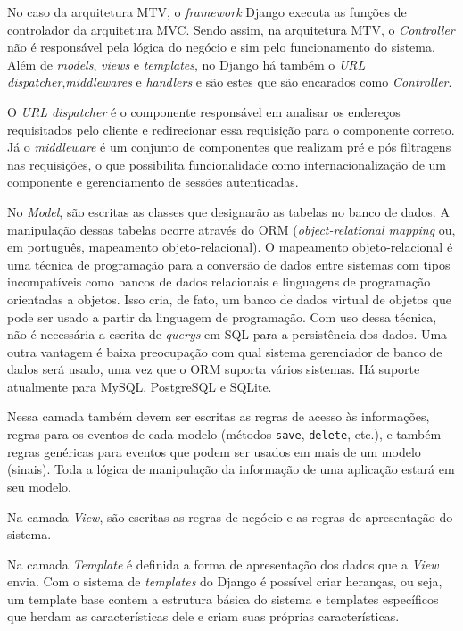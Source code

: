     No caso da arquitetura MTV, o \textit{framework} Django executa as funções de controlador da arquitetura MVC. Sendo assim, na arquitetura MTV, o \textit{Controller} não é responsável pela lógica do negócio e sim pelo funcionamento do sistema. Além de \textit{models}, \textit{views} e \textit{templates}, no Django há também o \textit{URL dispatcher},\textit{middlewares} e \textit{handlers} e são estes que são encarados como \textit{Controller}.

    O \textit{URL dispatcher} é o componente responsável em analisar os endereços requisitados pelo cliente e redirecionar essa requisição para o componente correto. Já o \textit{middleware} é um conjunto de componentes que realizam pré e pós filtragens nas requisições, o que possibilita funcionalidade como internacionalização de um componente e gerenciamento de sessões autenticadas.

    No \textit{Model}, são escritas as classes que designarão as tabelas no banco de dados. A manipulação dessas tabelas ocorre através do ORM (\textit{object-relational mapping} ou, em português, mapeamento objeto-relacional). O mapeamento objeto-relacional é uma técnica de programação para a conversão de dados entre sistemas com tipos incompatíveis como bancos de dados relacionais e linguagens de programação orientadas a objetos. Isso cria, de fato, um banco de dados virtual de objetos que pode ser usado a partir da linguagem de programação. Com uso dessa técnica, não é necessária a escrita de \textit{querys} em SQL para a persistência dos dados. Uma outra vantagem é baixa preocupação com qual sistema gerenciador de banco de dados será usado, uma vez que o ORM suporta vários sistemas. Há suporte atualmente para MySQL, PostgreSQL e SQLite.

    Nessa camada também devem ser escritas as regras de acesso às informações, regras para os eventos de cada modelo (métodos \texttt{save}, \texttt{delete}, etc.), e também regras genéricas para eventos que podem ser usados em mais de um modelo (sinais). Toda a lógica de manipulação da informação de uma aplicação estará em seu modelo.

    Na camada \textit{View}, são escritas as regras de negócio e as regras de apresentação do sistema.

    Na camada \textit{Template} é definida a forma de apresentação dos dados que a \textit{View} envia. Com o sistema de \textit{templates} do Django é possível criar heranças, ou seja, um template base contem a estrutura básica do sistema e templates específicos que herdam as características dele e criam suas próprias características.

